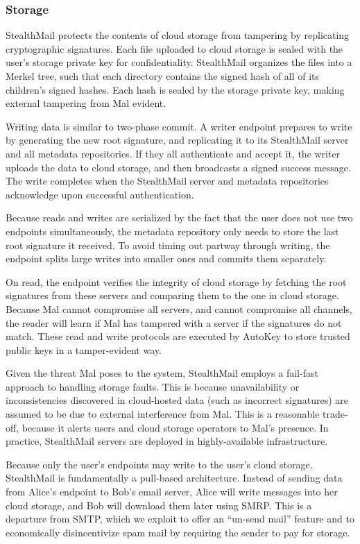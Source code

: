 \subsubsection{Storage}
StealthMail protects the contents of cloud storage from tampering by replicating cryptographic signatures.  Each file uploaded to cloud storage is sealed with the user’s storage private key for confidentiality.  StealthMail organizes the files into a Merkel tree, such that each directory contains the signed hash of all of its children’s signed hashes.  Each hash is sealed by the storage private key, making external tampering from Mal evident.

Writing data is similar to two-phase commit.  A writer endpoint prepares to write by generating the new root signature, and replicating it to its StealthMail server and all metadata repositories.  If they all authenticate and accept it, the writer uploads the data to cloud storage, and then broadcasts a signed success message.  The write completes when the StealthMail server and metadata repositories acknowledge upon successful authentication.

Because reads and writes are serialized by the fact that the user does not use two endpoints simultaneously, the metadata repository only needs to store the last root signature it received.  To avoid timing out partway through writing, the endpoint splits large writes into smaller ones and commits them separately.

On read, the endpoint verifies the integrity of cloud storage by fetching the root signatures from these servers and comparing them to the one in cloud storage.  Because Mal cannot compromise all servers, and cannot compromise all channels, the reader will learn if Mal has tampered with a server if the signatures do not match.  These read and write protocols are executed by AutoKey to store trusted public keys in a tamper-evident way.

Given the threat Mal poses to the system, StealthMail employs a fail-fast approach to handling storage faults.  This is because unavailability or inconsistencies discovered in cloud-hosted data (such as incorrect signatures) are assumed to be due to external interference from Mal.  This is a reasonable trade-off, because it alerts users and cloud storage operators to Mal’s presence.  In practice, StealthMail servers are deployed in highly-available infrastructure.

Because only the user’s endpoints may write to the user’s cloud storage, StealthMail is fundamentally a pull-based architecture.  Instead of sending data from Alice’s endpoint to Bob’s email server, Alice will write messages into her cloud storage, and Bob will download them later using SMRP.  This is a departure from SMTP, which we exploit to offer an ``un-send mail'' feature and to economically disincentivize spam mail by requiring the sender to pay for storage.

